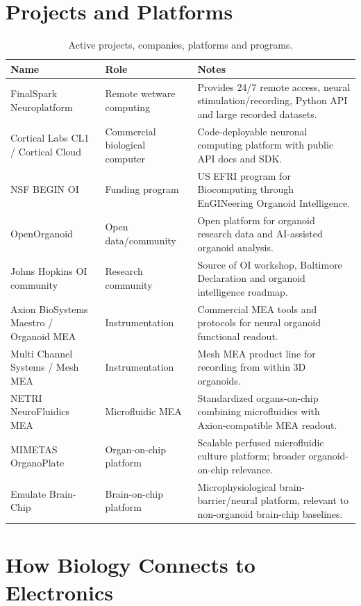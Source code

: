 \documentclass[10pt,twocolumn]{article}
\begin{document}
\section{Projects and Platforms}

\begin{table}[t]
\small
\caption{Active projects, companies, platforms and programs.}
\begin{tabularx}{\textwidth}{p{}p{}X}
\toprule
\textbf{Name} & \textbf{Role} & \textbf{Notes} \\
\midrule
FinalSpark Neuroplatform & Remote wetware computing & Provides 24/7 remote access, neural stimulation/recording, Python API and large recorded datasets. \\
Cortical Labs CL1 / Cortical Cloud & Commercial biological computer & Code-deployable neuronal computing platform with public API docs and SDK. \\
NSF BEGIN OI & Funding program & US EFRI program for Biocomputing through EnGINeering Organoid Intelligence. \\
OpenOrganoid & Open data/community & Open platform for organoid research data and AI-assisted organoid analysis. \\
Johns Hopkins OI community & Research community & Source of OI workshop, Baltimore Declaration and organoid intelligence roadmap. \\
Axion BioSystems Maestro / Organoid MEA & Instrumentation & Commercial MEA tools and protocols for neural organoid functional readout. \\
Multi Channel Systems / Mesh MEA & Instrumentation & Mesh MEA product line for recording from within 3D organoids. \\
NETRI NeuroFluidics MEA & Microfluidic MEA & Standardized organs-on-chip combining microfluidics with Axion-compatible MEA readout. \\
MIMETAS OrganoPlate & Organ-on-chip platform & Scalable perfused microfluidic culture platform; broader organoid-on-chip relevance. \\
Emulate Brain-Chip & Brain-on-chip platform & Microphysiological brain-barrier/neural platform, relevant to non-organoid brain-chip baselines. \\
\bottomrule
\end{tabularx}
\end{table}

\section{How Biology Connects to Electronics}
\end{document}
